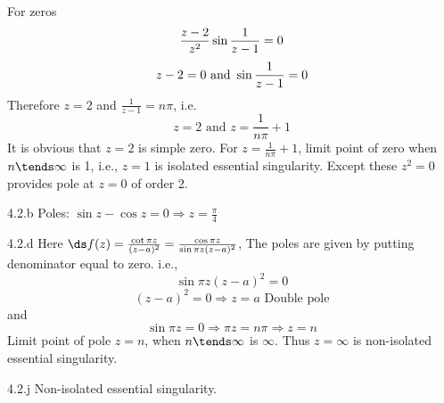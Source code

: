 \begin{Solution}{4.1}
	For zeros
	\[\frac{z-2}{z^2}\sin{1 \over z-1} = 0\]
	\[z-2 = 0 \text{ and } \sin{1 \over z-1} = 0\]
	Therefore $z=2$ and $\frac{1}{z-1}=n\pi$, i.e.
	\[z= 2 \text{ and } z=\frac{1}{n\pi}+1\]
	It is obvious that $z=2$ is simple zero. For $z=\frac{1}{n\pi}+1$, limit point of zero when $n\tends \infty$ is 1, i.e., $z=1$ is isolated essential singularity. Except these $z^2=0$ provides pole at $z=0$ of order 2.
	
\end{Solution}
\begin{Solution}{4.2.b}
	Poles: $\sin z - \cos z=0 \Rightarrow z=\frac{\pi}{4}$
	
\end{Solution}
\begin{Solution}{4.2.d}
	Here $\ds f(z)=\frac{\cot \pi z}{(z-a)^2}=\frac{\cos \pi z}{\sin \pi z(z-a)^2}$, The poles are given by putting denominator equal to zero. i.e.,
	\[\sin \pi z(z-a)^2 = 0\]
	\[(z-a)^2 = 0 \Rightarrow z=a \text{ Double pole}\]
	and
	\[\sin \pi z = 0 \Rightarrow \pi z = n\pi \Rightarrow z=n\]
	Limit point of pole $z=n$, when $n\tends \infty$ is $\infty$. Thus $z=\infty$ is non-isolated essential singularity.
	
\end{Solution}
\begin{Solution}{4.2.j}
	Non-isolated essential singularity.
	
\end{Solution}
